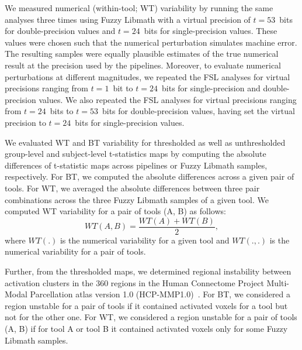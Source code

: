 \documentclass[11pt,onecolumn]{article}
\begin{document}
We measured numerical (within-tool; WT) variability by running the same analyses three
times using Fuzzy Libmath with a virtual precision of $t=53$~bits for
double-precision values and $t=24$~bits for single-precision values. These
values were chosen such that the numerical perturbation simulates machine
error. The resulting samples were equally plausible estimates of
the true  numerical result at the precision used by the pipelines. Moreover, to evaluate numerical perturbations at different magnitudes,
we repeated the FSL analyses for virtual
precisions ranging from $t=1$~bit to $t=24$~bits for single-precision
and double-precision values. We also repeated the FSL analyses for virtual
precisions ranging from $t=24$~bits to $t=53$~bits for double-precision values, having
set the virtual precision to $t=24$~bits for single-precision values.

We evaluated WT and BT variability for thresholded as well as unthresholded
group-level and subject-level t-statistics maps by computing the
absolute differences of t-statistic maps across pipelines or Fuzzy Libmath samples, respectively.
For BT, we computed the absolute differences across a given pair of tools.
For WT, we averaged the absolute differences between three pair combinations across the three
Fuzzy Libmath samples of a given tool. We computed WT variability for a pair of tools (A, B) as follows:
\begin{equation}
  WT(A,B) = \frac{WT(A) + WT(B)}{2},
  \label{eq:wt-pair}
\end{equation}
where $WT(.)$ is the numerical variability for a given tool
and $WT(., .)$ is the numerical variability for a pair of tools.

Further, from the thresholded maps, we determined regional instability
between activation clusters in the 360 regions in the Human Connectome
Project Multi-Modal Parcellation atlas version 1.0
(HCP-MMP1.0)~\cite{glasser2016multi}. For BT, we considered a region
unstable for a pair of tools if it contained activated voxels for a tool
but not for the other one. For WT, we considered a region unstable for a
pair of tools (A, B) if for tool A or tool B it contained activated voxels only for some Fuzzy Libmath
samples. 
\end{document}
